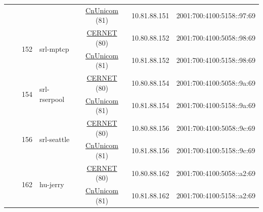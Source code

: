 \begin{small}
\begin{center}
\begin{longtable}{|c|c|c|c|c|c|c|c|}
  &  &  &  & \multicolumn{2}{|c|}{\tiny{\href{http://www.chinaunicom.com}{CnUnicom} (81)}} & \tiny{10.81.88.151} & \tiny{2001:700:4100:5158::97:69} \\* \cline{3-3}\cline{4-4}\cline{5-5}\cline{6-6}\cline{7-7}\cline{8-8}
  &  & \multirow{2}{*}{\tiny{152}} & \multicolumn{1}{|l|}{\multirow{2}{*}{\tiny{srl-mptcp}}} & \multicolumn{2}{|c|}{\tiny{\href{http://www.cernet.edu.cn}{CERNET} (80)}} & \tiny{10.80.88.152} & \tiny{2001:700:4100:5058::98:69} \\* \cline{5-5}\cline{6-6}\cline{7-7}\cline{8-8}
  &  &  &  & \multicolumn{2}{|c|}{\tiny{\href{http://www.chinaunicom.com}{CnUnicom} (81)}} & \tiny{10.81.88.152} & \tiny{2001:700:4100:5158::98:69} \\* \cline{3-3}\cline{4-4}\cline{5-5}\cline{6-6}\cline{7-7}\cline{8-8}
  &  & \multirow{2}{*}{\tiny{154}} & \multicolumn{1}{|l|}{\multirow{2}{*}{\tiny{srl-rserpool}}} & \multicolumn{2}{|c|}{\tiny{\href{http://www.cernet.edu.cn}{CERNET} (80)}} & \tiny{10.80.88.154} & \tiny{2001:700:4100:5058::9a:69} \\* \cline{5-5}\cline{6-6}\cline{7-7}\cline{8-8}
  &  &  &  & \multicolumn{2}{|c|}{\tiny{\href{http://www.chinaunicom.com}{CnUnicom} (81)}} & \tiny{10.81.88.154} & \tiny{2001:700:4100:5158::9a:69} \\* \cline{3-3}\cline{4-4}\cline{5-5}\cline{6-6}\cline{7-7}\cline{8-8}
  &  & \multirow{2}{*}{\tiny{156}} & \multicolumn{1}{|l|}{\multirow{2}{*}{\tiny{srl-seattle}}} & \multicolumn{2}{|c|}{\tiny{\href{http://www.cernet.edu.cn}{CERNET} (80)}} & \tiny{10.80.88.156} & \tiny{2001:700:4100:5058::9c:69} \\* \cline{5-5}\cline{6-6}\cline{7-7}\cline{8-8}
  &  &  &  & \multicolumn{2}{|c|}{\tiny{\href{http://www.chinaunicom.com}{CnUnicom} (81)}} & \tiny{10.81.88.156} & \tiny{2001:700:4100:5158::9c:69} \\* \cline{3-3}\cline{4-4}\cline{5-5}\cline{6-6}\cline{7-7}\cline{8-8}
  &  & \multirow{2}{*}{\tiny{162}} & \multicolumn{1}{|l|}{\multirow{2}{*}{\tiny{hu-jerry}}} & \multicolumn{2}{|c|}{\tiny{\href{http://www.cernet.edu.cn}{CERNET} (80)}} & \tiny{10.80.88.162} & \tiny{2001:700:4100:5058::a2:69} \\* \cline{5-5}\cline{6-6}\cline{7-7}\cline{8-8}
  &  &  &  & \multicolumn{2}{|c|}{\tiny{\href{http://www.chinaunicom.com}{CnUnicom} (81)}} & \tiny{10.81.88.162} & \tiny{2001:700:4100:5158::a2:69} \\ \hline
\end{longtable}
\end{center}
\end{small}



